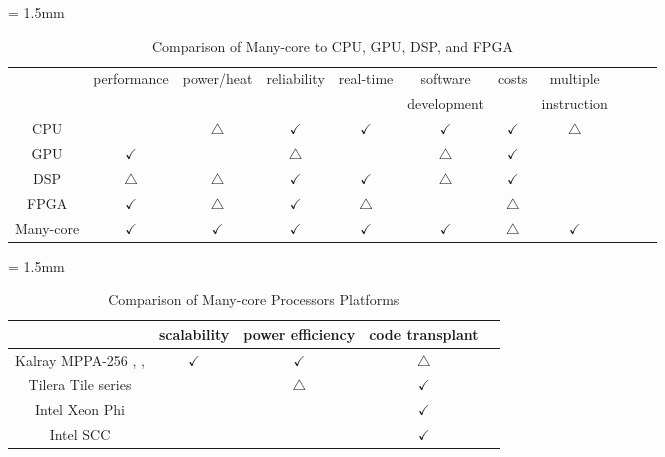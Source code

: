 \documentclass{sig-alternate-05-2015}
\begin{document}
\renewcommand{\arraystretch}{1.5}
\begin{table}[t]
  \caption{\label{tb:comparison_platforms}
    Comparison of Many-core to CPU, GPU, DSP, and FPGA}
  \centering
  \scriptsize	                    %
  \tabcolsep = 1.5mm              %
  \begin{tabular}{c|cccccccccc}
    \hline
    & \multirow{2}{*}{performance} & \multirow{2}{*}{power/heat} & \multirow{2}{*}{reliability} & \multirow{2}{*}{real-time} & software & \multirow{2}{*}{costs} & multiple\\
    &&&&& development && instruction \\
    \hline
    \hline
    CPU & & \(\bigtriangleup\) & \(\checkmark\) & \(\checkmark\) & \(\checkmark\) & \(\checkmark\) & \(\bigtriangleup\) \\
    GPU & \(\checkmark\) &  & \(\bigtriangleup\) &  & \(\bigtriangleup\) & \(\checkmark\)\\
    DSP & \(\bigtriangleup\) & \(\bigtriangleup\) & \(\checkmark\) & \(\checkmark\) & \(\bigtriangleup\) & \(\checkmark\) & \\
    FPGA & \(\checkmark\) & \(\bigtriangleup\) & \(\checkmark\) & \(\bigtriangleup\) &  & \(\bigtriangleup\) & \\
    Many-core & \(\checkmark\) & \(\checkmark\) & \(\checkmark\) & \(\checkmark\) & \(\checkmark\) & \(\bigtriangleup\) & \(\checkmark\) \\
    \hline
  \end{tabular}
  \vspace{-5mm}
\end{table}

\renewcommand{\arraystretch}{1.5}
\begin{table}[t]
  \caption{\label{tb:comparison_manycore}
    Comparison of Many-core Processors Platforms}
  \centering
  \scriptsize	                    %
  \tabcolsep = 1.5mm              %
  \begin{tabular}{c|cccc}
    \hline
    & scalability & power efficiency & code transplant & \\
    \hline
    \hline
    Kalray MPPA-256 \cite{de2013distributed}, \cite{de2013clustered}, \cite{de2014time} & \(\checkmark\) & \(\checkmark\) & \(\bigtriangleup\) & \\
    Tilera Tile series \cite{bell2008tile64} &  & \(\bigtriangleup\) & \(\checkmark\) & \\
    Intel Xeon Phi \cite{chrysos2014intel} \cite{chrysos2012intel} &  &  & \(\checkmark\) & \\
    Intel SCC \cite{baron2010single} &  &  & \(\checkmark\) & \\
    \hline
  \end{tabular}
  \vspace{-5mm}
\end{table}
\end{document}

